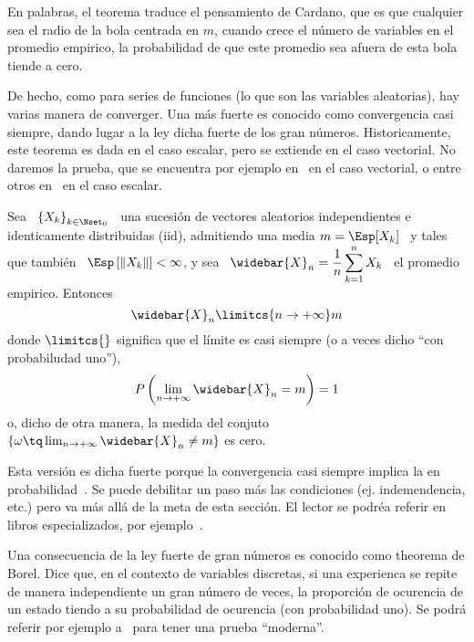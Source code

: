 En palabras, el teorema traduce el  pensamiento de Cardano, que es que cualquier
sea el radio de la bola centrada en $m$, cuando crece el n\'umero de variables en
el promedio  empirico, la probabilidad de  que este promedio sea  afuera de esta
bola tiende a cero.

De hecho, como  para series de funciones (lo que  son las variables aleatorias),
hay varias manera  de converger. Una m\'as fuerte  es conocido como convergencia
casi  siempre,  dando  lugar a  la  ley  dicha  fuerte  de los  gran  n\'umeros.
Historicamente, este teorema es dada en  el caso escalar, pero se extiende en el
caso  vectorial.    No  daremos  la   prueba,  que  se  encuentra   por  ejemplo
en~\cite[Teo.~6.4.2]{Gre63}    en   el   caso    vectorial,   o    entre   otros
en~\cite[Teo.~22.1]{Bil12} en el caso escalar.
%
\begin{teorema}
%
  Sea  \ $\left\{ X_k  \right\}_{k \in  \Nset_0}$ \  una sucesi\'on  de vectores
  aleatorios independientes  e identicamente distribuidas  (iid), admitiendo una
  media  $m =  \Esp[X_k]$ \  y  tales que  tambi\'en \  $\Esp\left[ \left\|  X_k
    \right\| \right] <  \infty$, y sea \ $\displaystyle  \widebar{X}_n = \frac1n
  \sum_{k=1}^n X_k$ \ el promedio empirico. Entonces
  \[
  \widebar{X}_n \limitcs{n \to +\infty} m
  \]
  donde $\limitcs{}$ significa que el l\'imite  es casi siempre (o a veces dicho
  ``con probabiludad uno''), \ie
  \[
  P\left(    \lim_{n \to +\infty}   \widebar{X}_n =  m \right) = 1
  \]
  o, dicho  de otra  manera, la medida  del conjuto  $\{ \omega \tq  \lim_{n \to
    +\infty} \widebar{X}_n \ne m \}$ es cero.
\end{teorema}
%

Esta versi\'on es dicha fuerte porque la convergencia casi siempre implica la en
probabilidad~\cite{Fel71, Shi84, AshDol99, JacPro03, AthLah06, Bil12, Coh13}. Se
puede debilitar un paso m\'as  las condiciones (ej. indemendencia, etc.) pero va
m\'as all\'a  de la  meta de esta  secci\'on. El  lector se podr\'ea  referir en
libros  especializados,  por  ejemplo~\cite{Fel71,  Shi84,  AshDol99,  JacPro03,
  AthLah06, Bil12, Coh13}.

Una consecuencia de la ley fuerte de gran n\'umeros es conocido como theorema de
Borel. Dice  que, en el  contexto de variables  discretas, si una  experienca se
repite de  manera independiente  un gran n\'umero  de veces, la  proporci\'on de
ocurencia de un  estado tiendo a su probabilidad  de ocurencia (con probabilidad
uno).  Se podr\'a  referir  por  ejemplo a~\cite{Wen91}  para  tener una  prueba
``moderna''.

